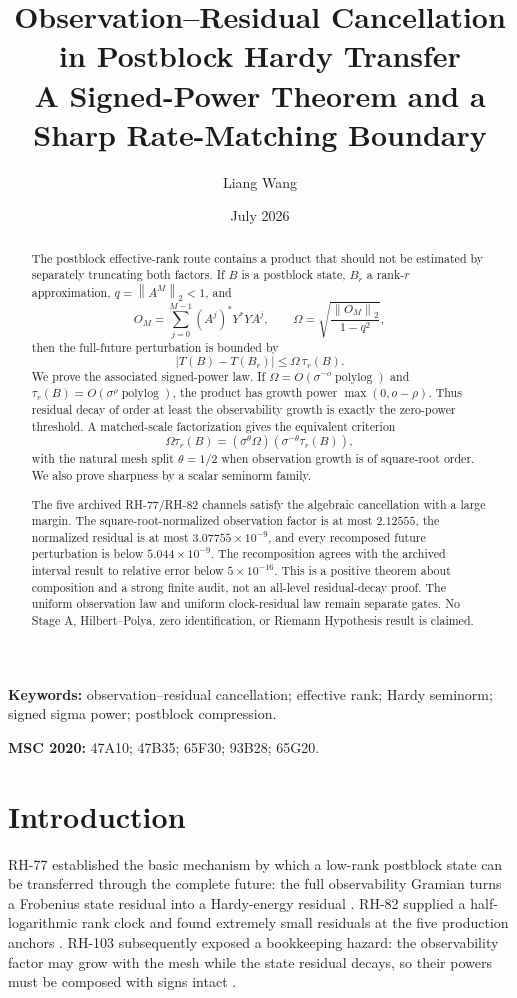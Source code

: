 \documentclass[11pt]{article}
\title{Observation--Residual Cancellation in Postblock Hardy Transfer\\
\large A Signed-Power Theorem and a Sharp Rate-Matching Boundary}
\author{Liang Wang}
\date{July 2026}
\theoremstyle{definition}
\theoremstyle{remark}
\newcommand{\norm}[1]{\left\lVert#1\right\rVert}
\begin{document}
\maketitle

\begin{abstract}
The postblock effective-rank route contains a product that should not be
estimated by separately truncating both factors.  If $B$ is a postblock state,
$B_r$ a rank-$r$ approximation, $q=\norm{A^M}_2<1$, and
\[
 O_M=\sum_{j=0}^{M-1}(A^j)^*Y^*YA^j,
 \qquad
 \Omega=\sqrt{\frac{\norm{O_M}_2}{1-q^2}},
\]
then the full-future perturbation is bounded by
\[
 |T(B)-T(B_r)|\le \Omega\,\tau_r(B).
\]
We prove the associated signed-power law.  If
$\Omega=O(\sigma^{-o}\operatorname{polylog})$ and
$\tau_r(B)=O(\sigma^{\rho}\operatorname{polylog})$, the product has growth
power $\max(0,o-\rho)$.  Thus residual decay of order at least the
observability growth is exactly the zero-power threshold.  A matched-scale
factorization gives the equivalent criterion
\[
 \Omega\tau_r(B)=
 (\sigma^\theta\Omega)(\sigma^{-\theta}\tau_r(B)),
\]
with the natural mesh split $\theta=1/2$ when observation growth is of
square-root order.  We also prove sharpness by a scalar seminorm family.

The five archived RH-77/RH-82 channels satisfy the algebraic cancellation
with a large margin.  The square-root-normalized observation factor is at
most $2.12555$, the normalized residual is at most $3.07755\times10^{-9}$,
and every recomposed future perturbation is below $5.044\times10^{-9}$.
The recomposition agrees with the archived interval result to relative error
below $5\times10^{-16}$.  This is a positive theorem about composition and a
strong finite audit, not an all-level residual-decay proof.  The uniform
observation law and uniform clock-residual law remain separate gates.  No
Stage A, Hilbert--Polya, zero identification, or Riemann Hypothesis result is
claimed.
\end{abstract}

\noindent\textbf{Keywords:} observation--residual cancellation; effective
rank; Hardy seminorm; signed sigma power; postblock compression.

\medskip
\noindent\textbf{MSC 2020:} 47A10; 47B35; 65F30; 93B28; 65G20.

\section{Introduction}

RH-77 established the basic mechanism by which a low-rank postblock state can
be transferred through the complete future: the full observability Gramian
turns a Frobenius state residual into a Hardy-energy residual
\citep{WangEffectiveRank2026}.  RH-82 supplied a half-logarithmic rank clock
and found extremely small residuals at the five production anchors
\citep{WangClock2026}.  RH-103 subsequently exposed a bookkeeping hazard:
the observability factor may grow with the mesh while the state residual
decays, so their powers must be composed with signs intact
\citep{WangPowerLedger2026}.
\end{document}
